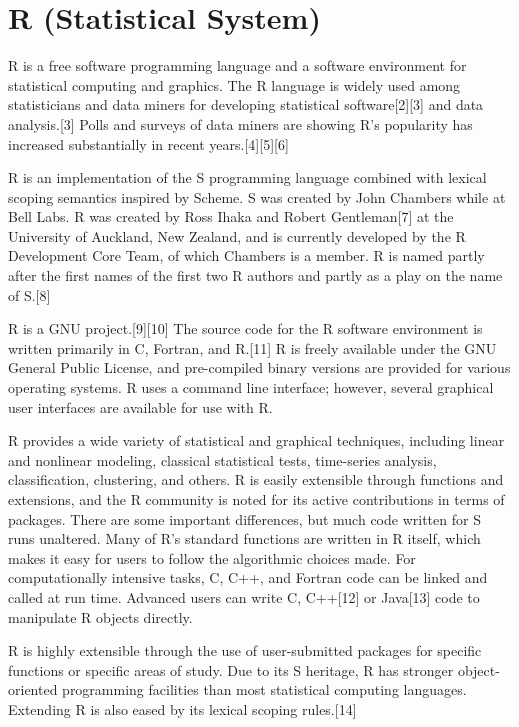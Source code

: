 	
	
	\newpage
	\chapter{R (Statistical System)}
	
	R is a free software programming language and a software environment for statistical computing and graphics. The R language is widely used among statisticians and data miners for developing statistical software[2][3] and data analysis.[3] Polls and surveys of data miners are showing R's popularity has increased substantially in recent years.[4][5][6]
	
	\vpara
	R is an implementation of the S programming language combined with lexical scoping semantics inspired by Scheme. S was created by John Chambers while at Bell Labs. R was created by Ross Ihaka and Robert Gentleman[7] at the University of Auckland, New Zealand, and is currently developed by the R Development Core Team, of which Chambers is a member. R is named partly after the first names of the first two R authors and partly as a play on the name of S.[8]
	
	\vpara
	R is a GNU project.[9][10] The source code for the R software environment is written primarily in C, Fortran, and R.[11] R is freely available under the GNU General Public License, and pre-compiled binary versions are provided for various operating systems. R uses a command line interface; however, several graphical user interfaces are available for use with R.
	
	\vpara
	R provides a wide variety of statistical and graphical techniques, including linear and nonlinear modeling, classical statistical tests, time-series analysis, classification, clustering, and others. R is easily extensible through functions and extensions, and the R community is noted for its active contributions in terms of packages. There are some important differences, but much code written for S runs unaltered. Many of R's standard functions are written in R itself, which makes it easy for users to follow the algorithmic choices made. For computationally intensive tasks, C, C++, and Fortran code can be linked and called at run time. Advanced users can write C, C++[12] or Java[13] code to manipulate R objects directly.
	
	\vpara
	R is highly extensible through the use of user-submitted packages for specific functions or specific areas of study. Due to its S heritage, R has stronger object-oriented programming facilities than most statistical computing languages. Extending R is also eased by its lexical scoping rules.[14]
	
